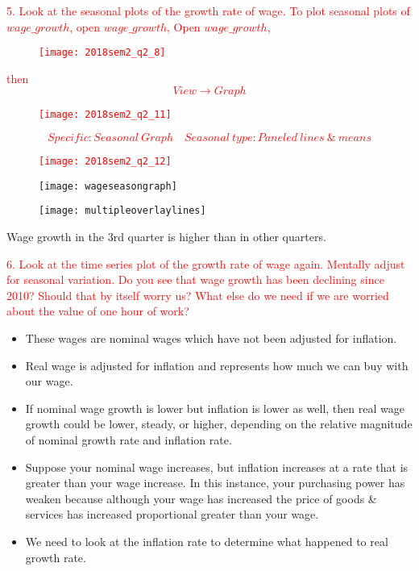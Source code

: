 \documentclass[12pt]{report}
\begin{document}
\noindent \textcolor{red}{5. Look at the seasonal plots of the growth rate of wage. To plot seasonal plots of $wage\_growth$, open $wage\_growth$, \noindent Open $wage\_growth$, \begin{figure}[H]
		\centerline{\texttt{[image: 2018sem2\_q2\_8]}}
	\end{figure}
	\vspace{-\baselineskip} then $$View \to Graph$$ \begin{figure}[H]
		\centerline{\texttt{[image: 2018sem2\_q2\_11]}}
	\end{figure}
	\vspace{-\baselineskip} $$Specific: Seasonal\ Graph \quad Seasonal\ type: Paneled\ lines\ \&\ means$$\begin{figure}[H]
		\centerline{\texttt{[image: 2018sem2\_q2\_12]}}
	\end{figure}
	\vspace{-\baselineskip}}
\begin{figure}[H]
	\centerline{\texttt{[image: wageseasongraph]}}
\end{figure}
\vspace{-\baselineskip}
\begin{figure}[H]
	\centerline{\texttt{[image: multipleoverlaylines]}}
\end{figure}
\vspace{-\baselineskip}

\noindent Wage growth in the 3rd quarter is higher than in other quarters.

\newpage
\noindent \textcolor{red}{6. Look at the time series plot of the growth rate of wage again. Mentally adjust for seasonal variation. Do you see that wage growth has been declining since 2010? Should that by itself worry us? What else do we need if we are worried about the value of one hour of work?}
\begin{itemize}
	\item These wages are nominal wages which have not been adjusted for inflation.
	\item Real wage is adjusted for inflation and represents how much we can buy with our wage.
	\item If nominal wage growth is lower but inflation is lower as well, then real wage growth could be lower, steady, or higher, depending on the relative magnitude of nominal growth rate and inflation rate.
	\item  Suppose your nominal wage increases, but inflation increases at a rate that is greater than your wage increase. In this instance, your purchasing power has weaken because although your wage has increased the price of goods \& services has increased proportional greater than your wage. 
	\item We need to look at the inflation rate to determine what happened to real growth rate.
\end{itemize}
\end{document}
